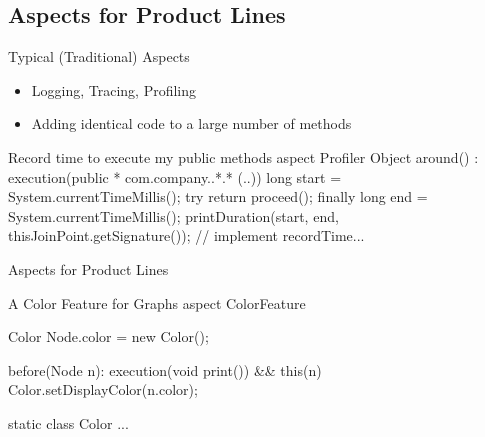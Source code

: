 \subsection{Aspects for Product Lines}

\begin{frame}[fragile]{Typical (Traditional) Aspects}
	\begin{itemize}
		\item Logging, Tracing, Profiling
		\item Adding identical code to a large number of methods
	\end{itemize}
\begin{codetight}{Record time to execute my public methods}
aspect Profiler {   
    Object around() : execution(public * com.company..*.* (..)) {
        long start = System.currentTimeMillis();
        try {
            return proceed();
        } finally {
            long end = System.currentTimeMillis();
            printDuration(start, end, 
                thisJoinPoint.getSignature());
        }
    }
    // implement recordTime...
}
\end{codetight}	
\end{frame}

\begin{frame}[fragile]{Aspects for Product Lines}
	\begin{mycolumns}[widths={45,55},animation=none]
	\mynextcolumn
\begin{codetight}{A Color Feature for Graphs}
aspect ColorFeature {
	Color Node.color = new Color();
	
	before(Node n): execution(void print()) && this(n) {
		Color.setDisplayColor(n.color);
	}
	
	static class Color {
		...
	}
}
\end{codetight}	
	\end{mycolumns}
\end{frame}

